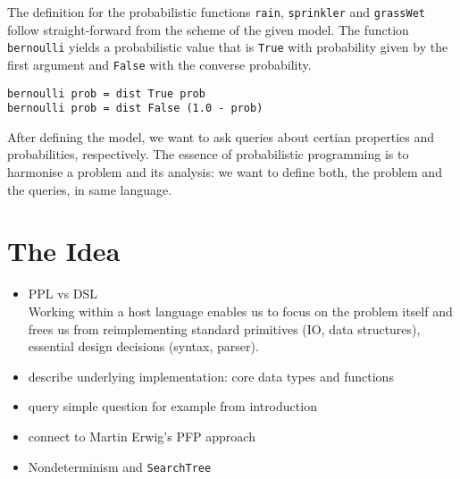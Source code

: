 \documentclass[
12pt, %
a4paper, %
oneside, %
]{llncs}
\newcommand{\code}[1]{{\texttt{#1}}}
\begin{document}
The definition for the probabilistic functions \code{rain},
\code{sprinkler} and \code{grassWet} follow straight-forward from the
scheme of the given model. %
The function \code{bernoulli} yields a probabilistic value that is
\code{True} with probability given by the first argument and
\code{False} with the converse probability. %

\begin{verbatim}
bernoulli prob = dist True prob
bernoulli prob = dist False (1.0 - prob)
\end{verbatim}

After defining the model, we want to ask queries about certian
properties and probabilities, respectively. %
The essence of probabilistic programming is to harmonise a problem and
its analysis: we want to define both, the problem and the queries, in
same language. %

\section{The Idea}

\begin{itemize}
\item PPL vs DSL\\
  Working within a host language enables us to focus on the
  problem itself and frees us from reimplementing standard primitives
  (IO, data structures), essential design decisions (syntax,
  parser). %
\item describe underlying implementation: core data types and
  functions
\item query simple question for example from introduction
\item connect to Martin Erwig's PFP approach
\item Nondeterminism and \code{SearchTree}
\end{itemize}
\end{document}

